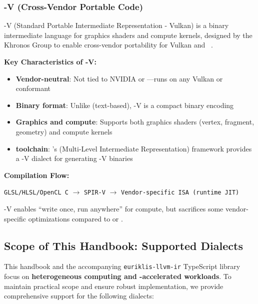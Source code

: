 \subsubsection{-V (Cross-Vendor Portable  Code)}

-V (Standard Portable Intermediate Representation - Vulkan) is a binary intermediate language for graphics shaders and compute kernels, designed by the Khronos Group to enable cross-vendor portability for Vulkan and ~\cite{spirvkhronos}.

\textbf{Key Characteristics of -V:}

\begin{itemize}[noitemsep]
  \item \textbf{Vendor-neutral}: Not tied to NVIDIA or ---runs on any Vulkan or  conformant 
  \item \textbf{Binary format}: Unlike   (text-based), -V is a compact binary encoding
  \item \textbf{Graphics and compute}: Supports both graphics shaders (vertex, fragment, geometry) and compute kernels
  \item \textbf{ toolchain}: 's  (Multi-Level Intermediate Representation) framework provides a -V dialect for generating -V binaries
\end{itemize}

\textbf{Compilation Flow:}
\begin{center}
\texttt{GLSL/HLSL/OpenCL C} $\rightarrow$ \texttt{SPIR-V} $\rightarrow$ \texttt{Vendor-specific ISA (runtime JIT)}
\end{center}

-V enables ``write once, run anywhere'' for  compute, but sacrifices some vendor-specific optimizations compared to  or .

\subsection{Scope of This Handbook: Supported  Dialects}

This handbook and the accompanying \texttt{euriklis-llvm-ir} TypeScript library focus on \textbf{heterogeneous computing and -accelerated workloads}. To maintain practical scope and ensure robust implementation, we provide comprehensive support for the following  dialects:

